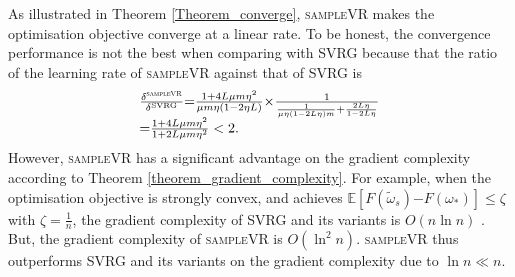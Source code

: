 \documentclass[letterpaper]{article}
\begin{document}
 As illustrated in Theorem \ref{Theorem_converge}, \textsc{sampleVR} makes the optimisation objective converge at a linear rate. To be honest,  the convergence performance is  not the best when comparing with SVRG  because that the ratio of the learning rate of \textsc{sampleVR} against that of \textsc{SVRG} is
\begin{equation}
\begin{array}{ll}
\frac{\delta^{\mathrm{\textsc{sampleVR}}}}{\delta^{\mathrm{SVRG}}} \mathrm{=} \frac{1+4L \mu m\eta^2}{\mu m \eta(1-2\eta L)} \mathrm{\times} \frac{1}{\frac{1}{\mu \eta(1-2L\eta)m} + \frac{2L\eta}{1-2L\eta}}  \\
\mathrm{=} \frac{1+4L\mu m \eta^2}{1+2L\mu m \eta^2} <2.
 \end{array} 
\end{equation} However, \textsc{sampleVR} has a significant advantage on the gradient complexity according to Theorem \ref{theorem_gradient_complexity}. For example, when the optimisation objective is strongly convex, and achieves $\mathbb{E}[F(\tilde{\omega}_s)\mathrm{-}F(\omega_\ast)] \mathrm{\le} \zeta$ with $\zeta\mathrm{=}\frac{1}{n}$, the gradient complexity of SVRG and its variants is $O\left(n \ln n\right)$ \citep{Allen2015UniVR}. But, the gradient complexity of \textsc{sampleVR}  is $O( \ln^2 n ) $. \textsc{sampleVR} thus  outperforms SVRG and its variants on the gradient complexity due to $\ln n \mathrm{\ll} n$.
\end{document}
